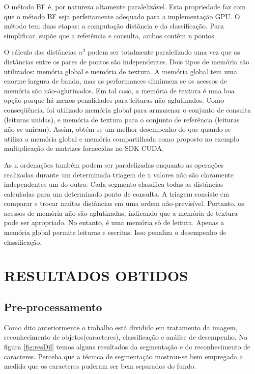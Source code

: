 \documentclass[letterpaper, 10 pt, conference]{ieeeconf}  %
\begin{document}
O método BF é, por natureza altamente paralelizável. Esta propriedade faz com
que o método BF seja perfeitamente adequado para a implementação GPU. O método
tem duas etapas: a computação distância e da classificação. Para simplificar,
supõe que a referência e consulta, ambos contêm n pontos.

O cálculo das distâncias $n^2$ podem ser totalmente paralelizado uma vez que as
distâncias entre os pares de pontos são independentes. Dois tipos de memória são
utilizados: memória global e memória de textura. A memória global tem uma enorme
largura de banda, mas as performances diminuem se os acessos de memória são
não-aglutinados. Em tal caso, a memória de textura é uma boa opção porque há
menos penalidades para leituras não-aglutinados. Como conseqüência, foi
utilizado memória global para armazenar o conjunto de consulta (leituras
unidas), e memória de textura para o conjunto de referência (leituras não se
uniram). Assim, obtém-se um melhor desempenho do que quando se utiliza a memória
global e memória compartilhada como proposto no exemplo multiplicação de
matrizes fornecidas no SDK CUDA.

As n ordenações também podem ser paralelizadas enquanto as operações realizadas
durante um determinada triagem de n valores não são claramente independentes um
do outro. Cada segmento classifica todas as distâncias calculadas para um
determinado ponto de consulta. A triagem consiste em comparar e trocar muitas
distâncias em uma ordem não-previsível. Portanto, os acessos de memória não são
aglutinadas, indicando que a memória de textura pode ser apropriado. No entanto,
é uma memória só de leitura. Apenas a memória global permite leituras e
escritas. Isso penaliza o desempenho de classificação.

\section{RESULTADOS OBTIDOS}
\subsection{Pre-processamento}
Como dito anteriormente o trabalho está dividido em tratamento da imagem,
reconhecimento de objetos(caracteres), classificação e análise de desempenho.
Na figura \ref{fig:resDil} temos alguns resultados da segmentação e
do reconhecimento de caracteres. Perceba que a técnica de segmentação mostrou-se
bem empregada a medida que os caracteres puderam ser bem separados do fundo.
 
\end{document}
